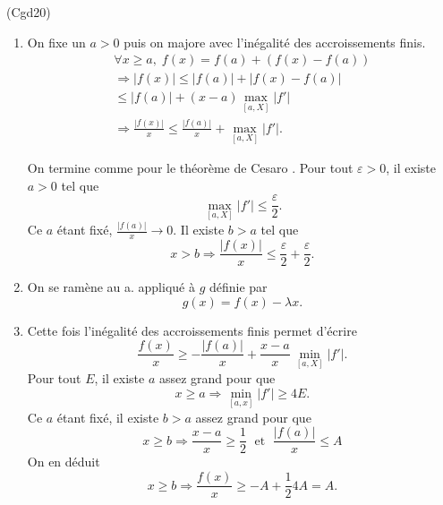\begin{tiny}(Cgd20)\end{tiny}
\begin{enumerate}
  \item On fixe un $a >0$ puis on majore avec l'inégalité des accroissements finis.
\begin{multline*}
  \forall x \geq a, \;
  f(x) = f(a) + \left(f(x) - f(a)\right)\\
  \Rightarrow |f(x)| \leq |f(a)| + \left| f(x) - f(a)\right|\\
  \leq |f(a)| + (x-a)\max_{\left[a,X\right]}|f'| \\
  \Rightarrow \frac{|f(x)|}{x} \leq \frac{|f(a)|}{x} + \max_{\left[a,X\right]}|f'|.
\end{multline*}

On termine comme pour le théorème de Cesaro .\newline
Pour tout $\varepsilon >0$, il existe $a>0$ tel que
\[
  \max_{\left[a,X\right]}|f'|\leq \frac{\varepsilon}{2}.
\]
Ce $a$ étant fixé, $\frac{|f(a)|}{x} \rightarrow 0$. Il existe $b >a$ tel que
\[
  x >b \Rightarrow
  \frac{|f(x)|}{x} \leq \frac{\varepsilon}{2} + \frac{\varepsilon}{2}.
\]

  \item On se ramène au a. appliqué à $g$ définie par
\[
  g(x) = f(x) - \lambda x.
\]

  \item Cette fois l'inégalité des accroissements finis permet d'écrire
\[
  \frac{f(x)}{x} \geq -\frac{|f(a)|}{x} + \frac{x-a}{x}\,\min_{\left[a,X\right]}|f'|. 
\]
Pour tout $E$, il existe $a$ assez grand pour que 
\[
 x\geq a \Rightarrow  \min_{\left[a,x\right]}|f'| \geq 4E.
\]
Ce $a$ étant fixé, il existe $b >a$ assez grand pour que
\[
  x \geq b \Rightarrow \frac{x-a}{x} \geq \frac{1}{2} \;\text{ et }\; \frac{|f(a)|}{x} \leq A
\]
On en déduit
\[
  x \geq b \Rightarrow \frac{f(x)}{x} \geq - A + \frac{1}{2} 4 A = A. 
\]

\end{enumerate}
